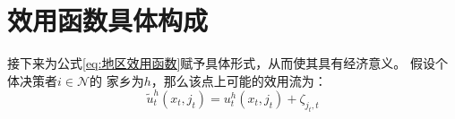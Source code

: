 \documentclass[a4paper,12pt,oneside]{book} %
\begin{document}


\section{效用函数具体构成}

接下来为公式\ref{eq:地区效用函数}赋予具体形式，从而使其具有经济意义。
假设个体决策者$i \in \mathcal{N}$的
家乡为$h$，那么该点上可能的效用流为：
\begin{equation}
  \tilde u_{t}^h(x_t,j_t)=u_{t}^h(x_t,j_t) +\zeta_{j_t,t}
  \label{eq:家乡效用函数}
\end{equation}
\end{document}
